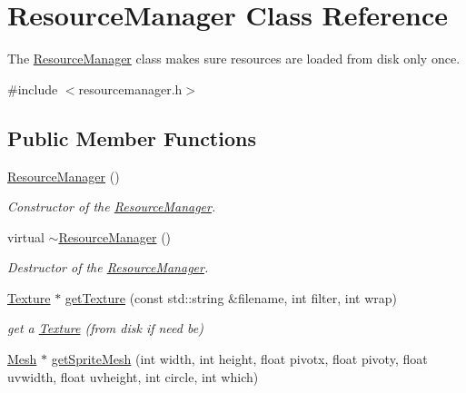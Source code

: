 \hypertarget{class_resource_manager}{}\section{Resource\+Manager Class Reference}
\label{class_resource_manager}


The \hyperlink{class_resource_manager}{Resource\+Manager} class makes sure resources are loaded from disk only once.  




{\ttfamily \#include $<$resourcemanager.\+h$>$}

\subsection*{Public Member Functions}
\begin{DoxyCompactItemize}
\item 
\hyperlink{class_resource_manager_a3b32babd2e81909bbd90d7f2d566fadb}{Resource\+Manager} ()
\begin{DoxyCompactList}\small\item\em Constructor of the \hyperlink{class_resource_manager}{Resource\+Manager}. \end{DoxyCompactList}\item 
\mbox{\label{class_resource_manager_a671c186e4630599e7e36d000c53eaf80}} 
virtual \hyperlink{class_resource_manager_a671c186e4630599e7e36d000c53eaf80}{$\sim$\+Resource\+Manager} ()
\begin{DoxyCompactList}\small\item\em Destructor of the \hyperlink{class_resource_manager}{Resource\+Manager}. \end{DoxyCompactList}\item 
\hyperlink{class_texture}{Texture} $\ast$ \hyperlink{class_resource_manager_a66f5436b2a1b78459f543e45ba5013eb}{get\+Texture} (const std\+::string \&filename, int filter, int wrap)
\begin{DoxyCompactList}\small\item\em get a \hyperlink{class_texture}{Texture} (from disk if need be) \end{DoxyCompactList}\item 
\hyperlink{class_mesh}{Mesh} $\ast$ \hyperlink{class_resource_manager_a83af97058447e2119fc870a405421e32}{get\+Sprite\+Mesh} (int width, int height, float pivotx, float pivoty, float uvwidth, float uvheight, int circle, int which)

\end{DoxyCompactItemize}
